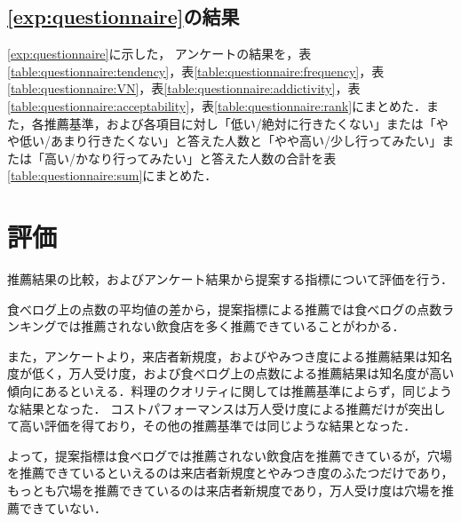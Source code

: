 	\subsection{\ref{exp:questionnaire}の結果}
	\ref{exp:questionnaire}に示した，
	アンケートの結果を，表\ref{table:questionnaire:tendency}，表\ref{table:questionnaire:frequency}，表\ref{table:questionnaire:VN}，表\ref{table:questionnaire:addictivity}，表\ref{table:questionnaire:acceptability}，表\ref{table:questionnaire:rank}にまとめた．また，各推薦基準，および各項目に対し「低い/絶対に行きたくない」または「やや低い/あまり行きたくない」と答えた人数と「やや高い/少し行ってみたい」または「高い/かなり行ってみたい」と答えた人数の合計を表\ref{table:questionnaire:sum}にまとめた．
	
	
	
	
	
	
	
	
	\newpage

\section{評価}
推薦結果の比較，およびアンケート結果から提案する指標について評価を行う．\par
食べログ上の点数の平均値の差から，提案指標による推薦では食べログの点数ランキングでは推薦されない飲食店を多く推薦できていることがわかる．
\par
また，アンケートより，来店者新規度，およびやみつき度による推薦結果は知名度が低く，万人受け度，および食べログ上の点数による推薦結果は知名度が高い傾向にあるといえる．料理のクオリティに関しては推薦基準によらず，同じような結果となった．
コストパフォーマンスは万人受け度による推薦だけが突出して高い評価を得ており，その他の推薦基準では同じような結果となった．%
\par
よって，提案指標は食べログでは推薦されない飲食店を推薦できているが，穴場を推薦できているといえるのは来店者新規度とやみつき度のふたつだけであり，もっとも穴場を推薦できているのは来店者新規度であり，万人受け度は穴場を推薦できていない．
